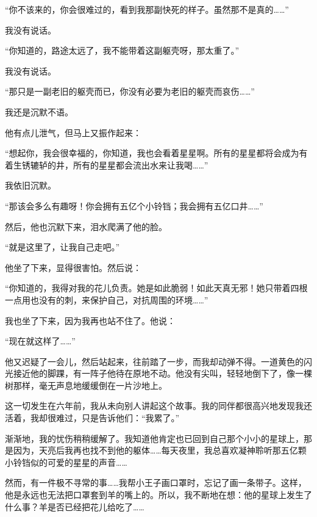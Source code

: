 “你不该来的，你会很难过的，看到我那副快死的样子。虽然那不是真的\ldots{}\ldots{}”

我没有说话。

“你知道的，路途太远了，我不能带着这副躯壳呀，那太重了。”

我没有说话。

“那只是一副老旧的躯壳而已，你没有必要为老旧的躯壳而哀伤\ldots{}\ldots{}”

我还是沉默不语。

他有点儿泄气，但马上又振作起来：

“想起你，我会很幸福的，你知道，我也会看着星星啊。所有的星星都将会成为有着生锈辘轳的井，所有的星星都会流出水来让我喝\ldots{}\ldots{}”

我依旧沉默。

“那该会多么有趣呀！你会拥有五亿个小铃铛；我会拥有五亿口井\ldots{}\ldots{}”

然后，他也沉默下来，泪水爬满了他的脸。

“就是这里了，让我自己走吧。”

他坐了下来，显得很害怕。然后说：

“你知道的，我得对我的花儿负责。她是如此脆弱！如此天真无邪！她只带着四根一点用也没有的刺，来保护自己，对抗周围的环境\ldots{}\ldots{}”

{\startalignment[center]
 \stopalignment}

我也坐了下来，因为我再也站不住了。他说：

“现在就这样了\ldots{}\ldots{}”

他又迟疑了一会儿，然后站起来，往前踏了一步，而我却动弹不得。一道黄色的闪光接近他的脚踝，有一阵子他待在原地不动。他没有尖叫，轻轻地倒下了，像一棵树那样，毫无声息地缓缓倒在一片沙地上。

\stoptitle

\starttitle[title={27}]

这一切发生在六年前，我从未向别人讲起这个故事。我的同伴都很高兴地发现我还活着，我却很难过，只是告诉他们：“我累了。”

渐渐地，我的忧伤稍稍缓解了。我知道他肯定也已回到自己那个小小的星球上，那是因为，天亮后我再也找不到他的躯体\ldots{}\ldots{}每天夜里，我总喜欢凝神聆听那五亿颗小铃铛似的可爱的星星的声音\ldots{}\ldots{}

然而，有一件极不寻常的事\ldots{}\ldots{}我帮小王子画口罩时，忘记了画一条带子。这样，他是永远也无法把口罩套到羊的嘴上的。所以，我不断地在想：他的星球上发生了什么事？羊是否已经把花儿给吃了\ldots{}\ldots{}

